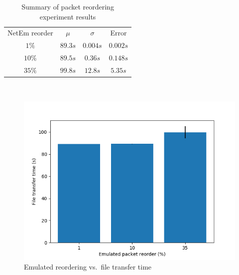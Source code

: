 \documentclass[conference]{IEEEtran}
\begin{document}
\begin{table}
    \centering
    \begin{tabular}{c c c c}
        \toprule
        NetEm reorder & $\mu$ & $\sigma$ & Error \\
        $1\%$   &   $89.3s$   &   $0.004s$    &   $0.002s$ \\
        $10\%$   &    $89.5s$   &   $0.36s$    &   $0.148s$ \\
        $35\%$   &    $99.8s$   &   $12.8s$    &   $5.35s$ \\
        \bottomrule
    \end{tabular}\label{table:reorder} \\
    \caption{Summary of packet reordering experiment results}\label{table:reorder}
\end{table}

\begin{figure}
    \centering
    \includegraphics[scale=0.6]{graphics/plot-reorder}
    \caption{Emulated reordering vs.\ file transfer time}\label{fig:reorder}
\end{figure}
\end{document}

